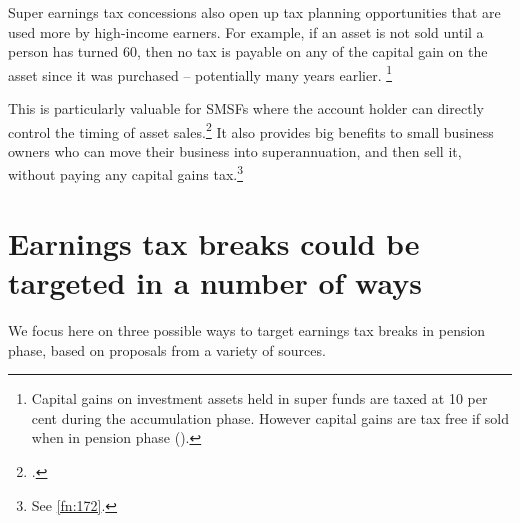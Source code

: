 Super earnings tax concessions also open up tax planning opportunities that are used more by high-income earners. For example, if an asset is not sold until a person has turned 60, then no tax is payable on any of the capital gain on the asset since it was purchased – potentially many years earlier.%
\footnote{Capital gains on investment assets held in super funds are taxed at 10 per cent during the accumulation phase. However capital gains are tax free if sold when in pension phase (\textcite[][69]{Treasury2015ReThink}).}

This is particularly valuable for SMSFs where the account holder can directly control the timing of asset sales.\footcite[][6]{Mercer2015SubmissionToReThink} It also provides big benefits to small business owners who can move their business into superannuation, and then sell it, without paying any capital gains tax.\footnote{See \vref{fn:172}.} 

\section{Earnings tax breaks could be targeted in a number of ways\label{sec:SUPER-6-3}}
We focus here on three possible ways to target earnings tax breaks in pension phase, based on proposals from a variety of sources.%
\enlargethispage{-0.5\baselineskip}\enlargethispage*{-0.5\baselineskip}

